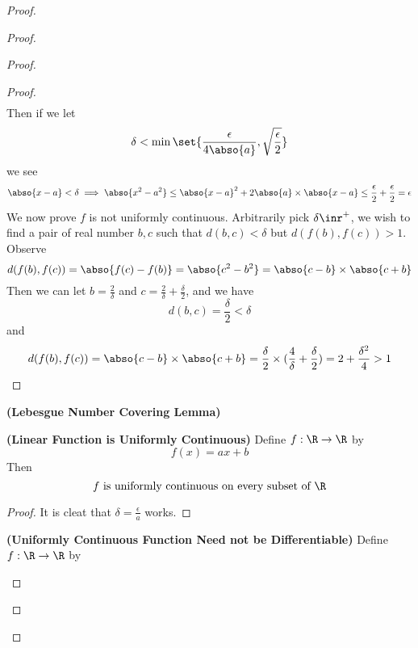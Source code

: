 \documentclass{report}
\begin{document}
\begin{proof}
\begin{proof}
\begin{proof}
\begin{proof}
\begin{align*}
\end{align*}
Then if we let
\begin{equation*}
  \delta< \min \set{\frac{\epsilon }{4\abso{a}},\sqrt{\frac{\epsilon}{2}} }
\end{equation*}
we see 
\begin{equation*}
\abso{x-a}<\delta \implies \abso{x^2-a^2}\leq \abso{x-a}^2 + 2\abso{a}\times \abso{x-a}\leq \frac{\epsilon}{2}+ \frac{\epsilon}{2}=\epsilon 
\end{equation*}
We now prove $f$ is not uniformly continuous. Arbitrarily pick $\delta\inr^+$, we wish to find a pair of real number $b,c$ such that $d(b,c)<\delta$ but $d(f(b),f(c))>1$.\\

Observe
\begin{equation*}
d(f(b),f(c))=\abso{f(c)-f(b)}=\abso{c^2-b^2}=\abso{c-b}\times \abso{c+b}
\end{equation*}
Then  we can let $b=\frac{2}{\delta}$ and $c=\frac{2}{\delta}+\frac{\delta}{2}$, and we have
\begin{equation*}
d(b,c)=\frac{\delta}{2}<\delta
\end{equation*}
and
\begin{equation*}
d(f(b),f(c))=\abso{c-b}\times \abso{c+b}=\frac{\delta}{2}\times (\frac{4}{\delta}+\frac{\delta}{2})=2+\frac{\delta^2}{4}>1
\end{equation*}
\end{proof}
\begin{lemma}
\label{5.3.5}
  \textbf{(Lebesgue Number Covering Lemma)}
\end{lemma}
\begin{theorem}
\label{5.3.6}
\textbf{(Linear Function is Uniformly Continuous)} Define $f:\R\rightarrow \R$ by 
\begin{equation*}
f(x)=ax+b
\end{equation*}
Then 
\begin{equation*}
f\text{ is uniformly continuous on every subset of $\R$}
\end{equation*}
\end{theorem}
\begin{proof}
It is cleat that $\delta=\frac{\epsilon}{a}$ works. 
\end{proof}
\begin{theorem}
\label{5.3.7}
\textbf{(Uniformly Continuous Function Need not be Differentiable)} Define $f:\R\rightarrow \R$ by 

\end{theorem}
\end{proof}
\end{proof}
\end{proof}
\end{document}
